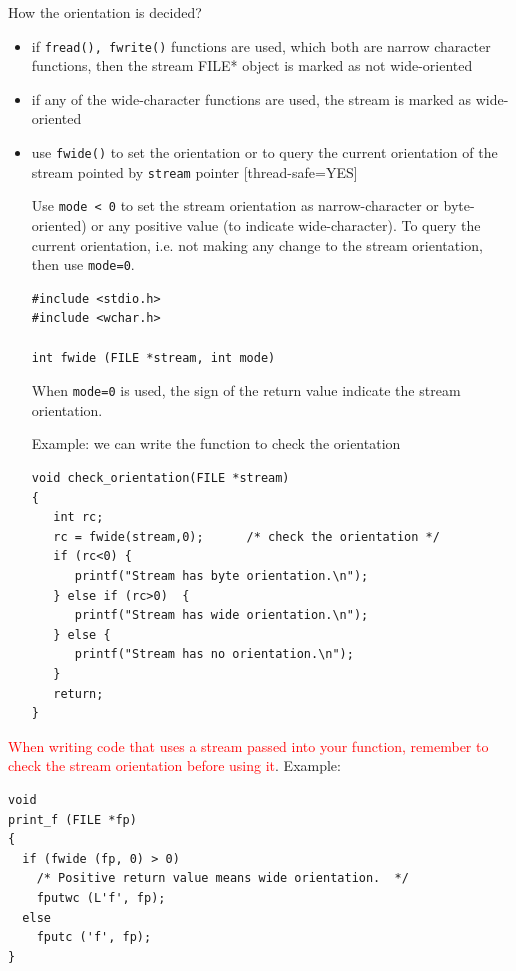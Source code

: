 \begin{enumerate}
How the orientation is decided?
\begin{itemize}
  \item if \verb!fread(), fwrite()! functions are used, which both are narrow
  character functions, then the stream FILE* object is marked as not
  wide-oriented
  
  \item if any of the wide-character functions are used, the stream is marked as
  wide-oriented
  
  \item use \verb!fwide()! to set the orientation or to query the current
  orientation of the stream pointed by \verb!stream! pointer [thread-safe=YES]
  
Use \verb!mode < 0! to set the stream orientation as narrow-character or
byte-oriented) or any positive value (to indicate wide-character). To query the
current orientation, i.e. not making any change to the stream orientation, then
use \verb!mode=0!.
\begin{verbatim}
#include <stdio.h>
#include <wchar.h>

int fwide (FILE *stream, int mode)
\end{verbatim}
When \verb!mode=0! is used, the sign of the return value indicate the stream
orientation. 

Example: we can write the function to check the orientation
\begin{verbatim}
void check_orientation(FILE *stream)
{
   int rc;
   rc = fwide(stream,0);      /* check the orientation */
   if (rc<0) {
      printf("Stream has byte orientation.\n");
   } else if (rc>0)  {
      printf("Stream has wide orientation.\n");
   } else {
      printf("Stream has no orientation.\n");
   }
   return;
}
\end{verbatim} 
\end{itemize}

\textcolor{red}{When writing code that uses a stream passed into your function,
remember to check the stream orientation before using it}. 
Example:
\begin{Verbatim}
void
print_f (FILE *fp)
{
  if (fwide (fp, 0) > 0)
    /* Positive return value means wide orientation.  */
    fputwc (L'f', fp);
  else
    fputc ('f', fp);
}
\end{Verbatim}

   
\end{enumerate} 

